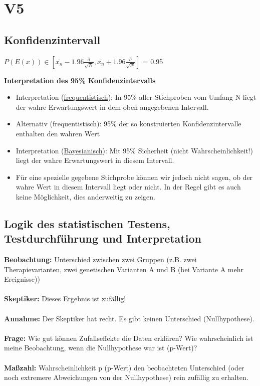 \section{V5}
\subsection{Konfidenzintervall}
$P(E(x)) \in \displaystyle [\bar{x_n} - 1.96 \frac{\hat{\sigma}}{\sqrt{N}}, \bar{x_n} + 1.96 \frac{\hat{\sigma}}{\sqrt{N}}]$ = 0.95

\textbf{Interpretation des 95\% Konfidenzintervalls}
\begin{itemize}
	\item Interpretation (\underline{frequentistisch}): In 95\% aller Stichproben vom Umfang N liegt der wahre Erwartungswert in dem oben angegebenen Intervall.
	\item Alternativ (frequentistisch): 95\% der so konstruierten Konfidenzintervalle enthalten den wahren Wert
	\item Interpretation (\underline{Bayesianisch}): Mit 95\% Sicherheit (nicht Wahrscheinlichkeit!) liegt der wahre Erwartungswert in diesem Intervall.
	\item Für eine spezielle gegebene Stichprobe können wir jedoch nicht sagen, ob der wahre Wert in diesem Intervall liegt oder nicht. In der Regel gibt es auch keine Möglichkeit, dies anderweitig zu zeigen.
\end{itemize}

\subsection{Logik des statistischen Testens, Testdurchführung und Interpretation}
\textbf{Beobachtung:} Unterschied zwischen zwei Gruppen (z.B. zwei Therapievarianten, zwei genetischen Varianten A und B (bei Variante A mehr Ereignisse))
\\\\
\textbf{Skeptiker:} Dieses Ergebnis ist zufällig!
\\\\
\textbf{Annahme:} Der Skeptiker hat recht. Es gibt keinen Unterschied (Nullhypothese).
\\\\
\textbf{Frage:} Wie gut können Zufallseffekte die Daten erklären? Wie wahrscheinlich ist meine Beobachtung, wenn die Nullhypothese war ist (p-Wert)?
\\\\
\textbf{Maßzahl:} Wahrscheinlichkeit p (p-Wert) den beobachteten Unterschied (oder noch extremere Abweichungen von der Nullhypothese) rein zufällig zu erhalten.

